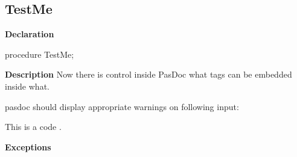 \documentclass{report}
\begin{document}
\subsection*{TestMe}
\begin{list}{}{
\setlength{\itemindent}{0cm}
\setlength{\listparindent}{0cm}
\setlength{\leftmargin}{\evensidemargin}
\addtolength{\leftmargin}{\tmplength}
\settowidth{\labelsep}{X}
\addtolength{\leftmargin}{\labelsep}
\setlength{\labelwidth}{\tmplength}
}
\begin{flushleft}
\item[\textbf{Declaration}\hfill]
\begin{ttfamily}
procedure TestMe;\end{ttfamily}


\end{flushleft}
\par
\item[\textbf{Description}]
Now there is control inside PasDoc what tags can be embedded inside what.

pasdoc should display appropriate warnings on following input:

\begin{ttfamily}This is a code .\end{ttfamily}

 



\par
\item[\textbf{Exceptions}]
\begin{description}
\item[\begin{ttfamily}EFoo\end{ttfamily}(\ref{warning_incorrect_tag_nesting.EFoo})] 
\end{description}


\end{list}
\end{document}
